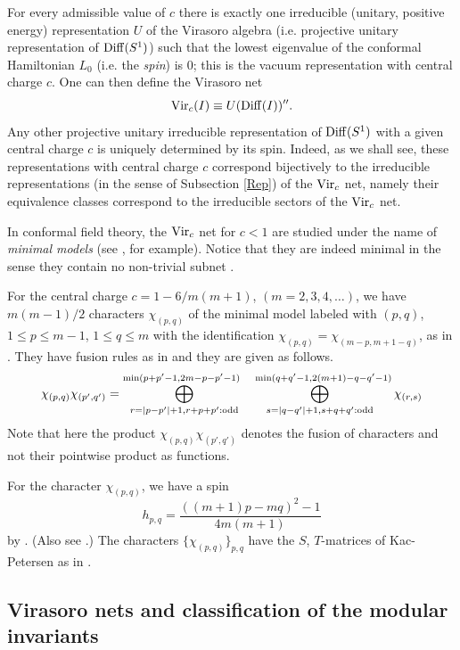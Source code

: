 \documentclass[12pt]{article}
\def\Diff{{\rm Diff}}
\def\Vir{{\rm Vir}}
\begin{document}
For every admissible value of $c$ there is exactly one irreducible 
(unitary, positive energy) representation $U$ of the Virasoro 
algebra (i.e. projective unitary representation  
of $\Diff(S^1)$) such that the lowest eigenvalue of the conformal 
Hamiltonian $L_0$ (i.e. the {\it spin}) is 0; this is the vacuum 
representation with central charge 
$c$. One can then define the Virasoro net
\[
\Vir_c(I)\equiv U(\Diff(I))''.
\]
Any other projective unitary
irreducible representation of $\Diff(S^1)$ with a given central 
charge $c$ is uniquely determined 
by its spin. Indeed, as we shall see, 
these representations with central charge $c$
correspond bijectively to the irreducible representations (in the 
sense of Subsection \ref{Rep}) of
the $\Vir_c$ net, namely their equivalence classes correspond
to the irreducible sectors of the $\Vir_c$ net.

In conformal field theory, the $\Vir_c$ net for $c<1$ are studied 
under the name of {\it minimal models} (see \cite[Chapters 7--8]{DMS}, for
example). Notice that they are indeed minimal in the sense they 
contain no non-trivial subnet \cite{C}.

For the central charge $c=1-6/m(m+1)$, $(m=2,3,4,\dots)$,
we have $m(m-1)/2$  characters $\chi_{(p,q)}$ of the
minimal model labeled with
$(p,q)$, $1\le p\le m-1$, $1\le q\le m$ with the identification
$\chi_{(p,q)}=\chi_{(m-p,m+1-q)}$, as in \cite[Subsection 7.3.4]{DMS}.
They have fusion rules as in \cite[Subsection 7.3.3]{DMS} and
they are given as follows.
\begin{equation}\label{fusion}
\chi_{(p,q)}\chi_{(p',q')}=
\bigoplus_{r=|p-p'|+1, r+p+p':{\rm odd}}
^{\min(p+p'-1, 2m-p-p'-1)\hphantom{x}}
\bigoplus_{s=|q-q'|+1, s+q+q':{\rm odd}}
^{\hphantom{x}\min(q+q'-1, 2(m+1)-q-q'-1)}
\chi_{(r,s)}
\end{equation}
Note that here the product $\chi_{(p,q)}\chi_{(p',q')}$ denotes the 
fusion of characters and not their pointwise product as functions.

For the character $\chi_{(p,q)}$, we have a spin
\begin{equation}
\label{spin}
h_{p,q}=\frac{((m+1)p-mq)^2-1}{4m(m+1)}
\end{equation}
by \cite{GKO}. (Also see \cite[Subsection 7.3.3]{DMS}.)
The characters $\{\chi_{(p,q)}\}_{p,q}$ have the $S$, $T$-matrices
of Kac-Petersen as in \cite[Section 10.6]{DMS}.

\subsection{Virasoro nets and classification of the modular invariants}
\end{document}

